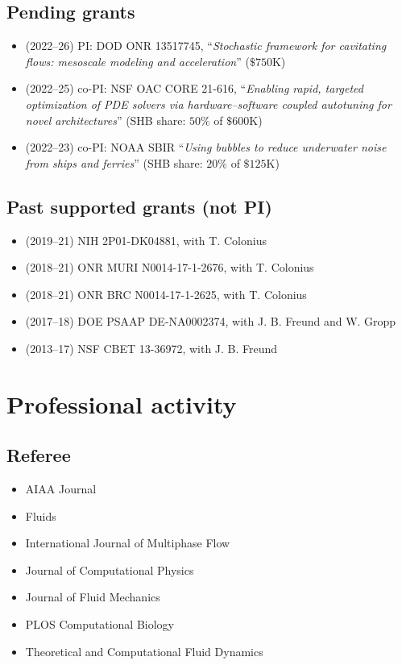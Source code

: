 \subsection{Pending grants}

\begin{itemize}
    \item (2022--26) PI: DOD ONR 13517745, ``\textit{Stochastic framework for cavitating flows: mesoscale modeling and acceleration}'' ($\$750$K)
    \item (2022--25) co-PI: NSF OAC CORE 21-616, ``\textit{Enabling rapid, targeted optimization of PDE solvers via hardware--software coupled autotuning for novel architectures}'' (SHB share: $50\%$ of $\$600$K)
    \item (2022--23) co-PI: NOAA SBIR ``\textit{Using bubbles to reduce underwater noise from ships and ferries}'' (SHB share: $20\%$ of $\$125$K)

\end{itemize}

\subsection{Past supported grants (not PI)}

\begin{itemize}
    \item (2019--21) NIH 2P01-DK04881, with T. Colonius
    \item (2018--21) ONR MURI N0014-17-1-2676, with T. Colonius
    \item (2018--21) ONR BRC N0014-17-1-2625, with T. Colonius
    \item (2017--18) DOE PSAAP DE-NA0002374, with J. B. Freund and W. Gropp
    \item (2013--17) NSF CBET 13-36972, with J. B. Freund
\end{itemize}

\section{Professional activity}

\subsection{Referee}

\begin{itemize}
    \item AIAA Journal
    \item Fluids
    \item International Journal of Multiphase Flow
    \item Journal of Computational Physics
    \item Journal of Fluid Mechanics
    \item PLOS Computational Biology
    \item Theoretical and Computational Fluid Dynamics
\end{itemize}

